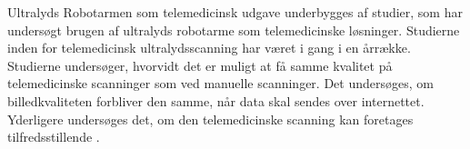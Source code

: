 Ultralyds Robotarmen som telemedicinsk udgave underbygges af studier, som har undersøgt brugen af ultralyds robotarme som telemedicinske løsninger. Studierne inden for telemedicinsk ultralydsscanning har været i gang i en årrække. Studierne undersøger, hvorvidt det er muligt at få samme kvalitet på telemedicinske scanninger som ved manuelle scanninger. Det undersøges, om billedkvaliteten forbliver den samme, når data skal sendes over internettet. Yderligere undersøges det, om den telemedicinske scanning kan foretages tilfredsstillende \cite{8}\cite{5}\cite{18}\cite{Hjerterobot}. 





